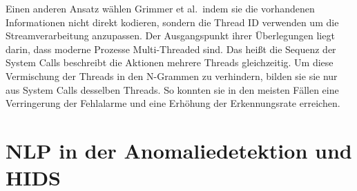         Einen anderen Ansatz wählen Grimmer et al.\ indem sie die vorhandenen Informationen nicht direkt kodieren, sondern die Thread ID verwenden um die Streamverarbeitung anzupassen.
        Der Ausgangspunkt ihrer Überlegungen liegt darin, dass moderne Prozesse Multi-Threaded sind.
        Das heißt die Sequenz der System Calls beschreibt die Aktionen mehrere Threads gleichzeitig.
        Um diese Vermischung der Threads in den N-Grammen zu verhindern, bilden sie sie nur aus System Calls desselben Threads.
        So konnten sie in den meisten Fällen eine Verringerung der Fehlalarme und eine Erhöhung der Erkennungsrate erreichen.\cite{IDSTHREADGRIMMER2021}

        

\section{NLP in der Anomaliedetektion und HIDS}\label{sec:related_nlp}


